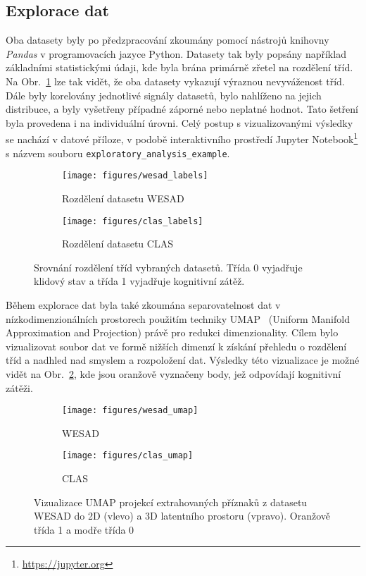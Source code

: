 \subsection{Explorace dat}
\label{subsec:explorace_dat}
Oba datasety byly po předzpracování zkoumány pomocí nástrojů knihovny
\textit{Pandas} v programovacích jazyce Python. Datasety tak byly popsány
například základními statistickými údaji, kde byla brána primárně zřetel na
rozdělení tříd. Na Obr.~\ref{fig:rozdeleni_trid} lze tak vidět, že oba datasety
vykazují výraznou nevyváženost tříd. Dále byly korelovány jednotlivé signály
datasetů, bylo nahlíženo na jejich distribuce, a byly vyšetřeny případné záporné
nebo neplatné hodnot. Tato šetření byla provedena i na individuální úrovni. Celý
postup s vizualizovanými výsledky se nachází v datové příloze, v podobě
interaktivního prostředí Jupyter Notebook\footnote{\url{https://jupyter.org}} s
názvem souboru \texttt{exploratory\_analysis\_example}.

\begin{figure}[h]
    \begin{subfigure}[h]{0.48\linewidth}
        \texttt{[image: figures/wesad\_labels]}
        \caption{Rozdělení datasetu WESAD}
    \end{subfigure}
    \hfill
    \begin{subfigure}[h]{0.48\linewidth}
        \texttt{[image: figures/clas\_labels]}
        \caption{Rozdělení datasetu CLAS}
    \end{subfigure}
    \caption{Srovnání rozdělení tříd vybraných datasetů. Třída 0 vyjadřuje
        klidový stav a třída 1 vyjadřuje kognitivní zátěž.}
    \label{fig:rozdeleni_trid}
\end{figure}

Během explorace dat byla také zkoumána separovatelnost dat v
nízkodimenzionálních prostorech použitím techniky \gls{UMAP}~\cite{umap2018}
(Uniform Manifold Approximation and Projection) právě pro redukci
dimenzionality. Cílem bylo vizualizovat soubor dat ve formě nižších dimenzí k
získání přehledu o rozdělení tříd a nadhled nad smyslem a rozpoložení dat.
Výsledky této vizualizace je možné vidět na Obr.~\ref{fig:umap}, kde jsou
oranžově vyznačeny body, jež odpovídají kognitivní zátěži.

\begin{figure}[h]
    \begin{subfigure}[h]{0.48\linewidth}
        \texttt{[image: figures/wesad\_umap]}
        \caption{WESAD}
    \end{subfigure}
    \hfill
    \begin{subfigure}[h]{0.48\linewidth}
        \texttt{[image: figures/clas\_umap]}
        \caption{CLAS}
    \end{subfigure}
    \caption{Vizualizace UMAP projekcí extrahovaných příznaků z datasetu WESAD
        do 2D (vlevo) a 3D latentního prostoru (vpravo). Oranžově třída 1 a modře
        třída 0}
    \label{fig:umap}
\end{figure}

